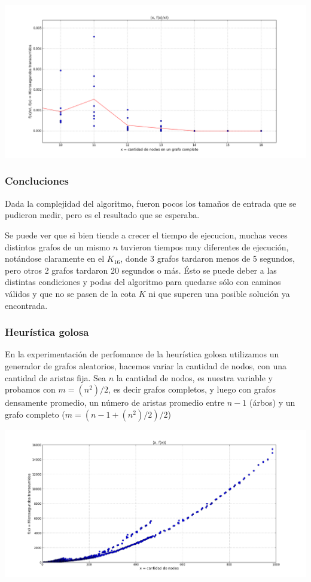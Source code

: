 \begin{center}
	\includegraphics[scale=0.41]{img/exacto/fact_n_10_16.png}
\end{center}

\subsubsection{Concluciones}
Dada la complejidad del algoritmo, fueron pocos los tama\~nos de entrada que se pudieron medir, pero es el resultado que se esperaba.

Se puede ver que si bien tiende a crecer el tiempo de ejecucion, muchas veces distintos grafos de un mismo $n$ tuvieron tiempos muy diferentes de ejecuci\'on, not\'andose claramente en el $K_{16}$, donde 3 grafos tardaron menos de 5 segundos, pero otros 2 grafos tardaron 20 segundos o m\'as. \'Esto se puede deber a las distintas condiciones y podas del algoritmo para quedarse s\'olo con caminos v\'alidos y que no se pasen de la cota $K$ ni que superen una posible soluci\'on ya encontrada.




\subsubsection{Heur\'istica golosa}

En la experimentaci\'on de perfomance de la heur\'istica golosa utilizamos un generador de grafos aleatorios, hacemos variar la cantidad de nodos, con una cantidad de aristas fija. Sea $n$ la cantidad de nodos, es nuestra variable y probamos con $m = (n^2)/2$, es decir grafos completos, y luego con grafos densamente promedio, un n\'umero de aristas promedio entre $n-1$ (\'arbos) y un grafo completo ($ m = (n - 1 + (n^2)/2) /2 $)

\begin{center}
\includegraphics[scale=0.45]{img/golosa_fx.png}
\end{center}
\vspace{2mm}

